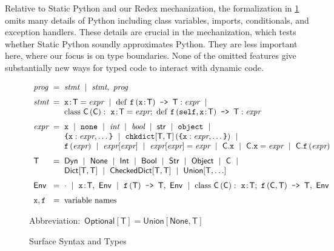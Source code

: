 \documentclass[english,cleveref,submission]{programming}
\makeatletter
\newcommand{\SP}{Static Python}
\newcommand{\code}[1]{\texttt{#1}}
\newcommand{\defeq}{=}
\newcommand{\langmid}{~\mid~} %
\newenvironment{langarray}{\(\begin{array}{l@{\hspace{2mm}}c@{\hspace{2mm}}l}}{\end{array}\)}
\newcommand{\spapp}[2]{#1\,(#2)}
\newcommand{\spann}[2]{#1\!:\!#2}
\newcommand{\typefont}[1]{\mathsf{#1}}
\newcommand{\codefont}[1]{\emph{#1}}
\newcommand{\paramtype}[2]{#1[#2]}
\newcommand{\sptype}{\typefont{T}}
\newcommand{\sptclass}{\typefont{C}}
\newcommand{\sptint}{\typefont{Int}}
\newcommand{\sptstr}{\typefont{Str}}
\newcommand{\sptbool}{\typefont{Bool}}
\newcommand{\sptdyn}{\typefont{Dyn}}
\newcommand{\sptobject}{\typefont{Object}}
\newcommand{\sptnone}{\typefont{None}}
\newcommand{\sptoptional}[1]{\paramtype{\typefont{Optional}}{#1}}
\newcommand{\sptunion}[1]{\paramtype{\typefont{Union}}{#1}}
\newcommand{\sptrawpydict}{\typefont{Dict}}
\newcommand{\sptrawchkdict}{\typefont{CheckedDict}} %
\newcommand{\sptpydict}[2]{\paramtype{\sptrawpydict}{#1, #2}}
\newcommand{\sptchkdict}[2]{\paramtype{\sptrawchkdict}{#1, #2}}
\newcommand{\sptenv}{\typefont{Env}}
\newcommand{\sptenvnil}{\cdot}
\newcommand{\sptvardef}[2]{\spann{#1}{#2}}
\newcommand{\sptfundef}[3]{\spapp{#1}{#2}\code{ -> }#3}
\newcommand{\sptclassdef}[4]{\mathrm{class}~\spapp{#1}{#2}:~#3;~#4}
\newcommand{\spx}{\code{x}}
\newcommand{\spf}{\code{f}}
\newcommand{\spc}{\sptclass}
\newcommand{\spprog}{\codefont{prog}}
\newcommand{\spstmt}{\codefont{stmt}}
\newcommand{\spexpr}{\codefont{expr}}
\newcommand{\spvardef}[3]{\sptvardef{#1}{#2} = #3}
\newcommand{\spfundef}[4]{\mathrm{def}~\spapp{#1}{#2}\code{ -> }#3: #4}
\newcommand{\spclassdef}[4]{\mathrm{class}~\spapp{#1}{#2}:~#3;~#4}
\newcommand{\spself}{\code{self}}
\newcommand{\spobject}{\code{object}}
\newcommand{\spnone}{\code{none}}
\newcommand{\spint}{\codefont{int}}
\newcommand{\spbool}{\codefont{bool}}
\newcommand{\spstr}{\typefont{str}}
\newcommand{\sppydict}[1]{\code{\{}#1\code{\}}}
\newcommand{\spchkdict}[3]{\spapp{\paramtype{\code{chkdict}}{#1, #2}}{#3}}
\newcommand{\spdictref}[2]{#1[#2]}
\newcommand{\spdictset}[3]{\spdictref{#1}{#2} = #3}
\newcommand{\spobjref}[2]{#1.#2}
\newcommand{\spobjset}[3]{\spobjref{#1}{#2} = #3}
\newcommand{\spobjapp}[3]{\spobjref{#1}{\spapp{#2}{#3}}}
\makeatother
\begin{document}
Relative to \SP{} and our Redex mechanization, the formalization in \cref{f:surface-types} omits
many details of Python including class variables, imports, conditionals, and exception handlers.
These details are crucial in the mechanization, which tests whether \SP{}
soundly approximates Python.
They are less important here, where our focus is on type boundaries.
None of the omitted features give substantially new ways for typed code to interact with dynamic code.

\begin{figure}[t]
  \begin{langarray}
    \spprog & \defeq &
      \spstmt \langmid \spstmt,~\spprog
    \\[1.5ex]
    \spstmt & \defeq &
      \spvardef{\spx}{\sptype}{\spexpr} \langmid
      \spfundef{\spf}{\spann{\spx}{\sptype}}{\sptype}{\spexpr} \langmid
  \\ & &
      \spclassdef{\spc}{\spc}{\spvardef{\spx}{\sptype}{\spexpr}}{\spfundef{\spf}{\spself, \spann{\spx}{\sptype}}{\sptype}{\spexpr}}
    \\[1.5ex]
    \spexpr & \defeq &
      \spx \langmid \spnone \langmid \spint \langmid \spbool \langmid \spstr \langmid \spobject \langmid
  \\ & &
      \sppydict{\spx: \spexpr, \ldots} \langmid
      \spchkdict{\sptype}{\sptype}{\sppydict{\spx: \spexpr, \ldots}} \langmid
  \\ & &
      \spapp{\spf}{\spexpr} \langmid
      \spdictref{\spexpr}{\spexpr} \langmid
      \spdictset{\spexpr}{\spexpr}{\spexpr} \langmid
      \spobjref{\spc}{\spx} \langmid
      \spobjset{\spc}{\spx}{\spexpr} \langmid
      \spobjapp{\spc}{\spf}{\spexpr}
    \\[1.5ex]
    \sptype & \defeq &
      \sptdyn \langmid
      \sptnone \langmid
      \sptint \langmid
      \sptbool \langmid
      \sptstr \langmid
      \sptobject \langmid
      \sptclass \langmid
  \\ & &
      \sptpydict{\sptype}{\sptype} \langmid
      \sptchkdict{\sptype}{\sptype} \langmid
      \sptunion{\sptype, \ldots}
    \\[1.5ex]
    \sptenv & \defeq &
      \sptenvnil \langmid
      \sptvardef{\spx}{\sptype},~\sptenv \langmid
      \sptfundef{\spf}{\sptype}{\sptype},~\sptenv \langmid
      \sptclassdef{\spc}{\spc}{\sptvardef{\spx}{\sptype}}{\sptfundef{\spf}{\sptclass, \sptype}{\sptype}},~\sptenv
    \\[1.5ex]
    \spx, \spf & \defeq & \mbox{variable names}
  \end{langarray}

  \bigskip
  \mbox{Abbreviation: $\sptoptional{\sptype} \defeq \sptunion{\sptnone, \sptype}$}

  \caption{Surface Syntax and Types}
  \label{f:surface-types}
\end{figure}
\end{document}
